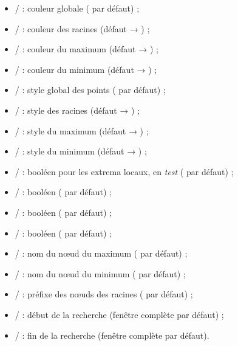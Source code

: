 \documentclass[11pt,a4paper]{ltxdoc}
\begin{document}
\begin{itemize}
  \item {} /  : couleur globale ( par défaut) ;
  \item {} /  : couleur des racines (défaut → ) ;
  \item {} /  : couleur du maximum (défaut → ) ;
  \item {} /  : couleur du minimum (défaut → ) ;
  \item {} /  : style global des points ( par défaut) ;
  \item {} /  : style des racines (défaut → ) ;
  \item {} /  : style du maximum (défaut → ) ;
  \item {} /  : style du minimum (défaut → ) ;
  \item {} /  : booléen pour les extrema locaux, en \textit{test} ( par défaut) ;
  \item {} /  : booléen ( par défaut) ;
  \item {} /  : booléen ( par défaut) ;
  \item {} /  : booléen ( par défaut) ;
  \item {} /  : nom du nœud du maximum ( par défaut) ;
  \item {} /  : nom du nœud du minimum ( par défaut) ;
  \item {} /  : préfixe des nœuds des racines ( par défaut) ;
  \item {} /  : début de la recherche (fenêtre complète par défaut) ;
  \item {} /  : fin de la recherche (fenêtre complète par défaut).
\end{itemize}
\end{document}
